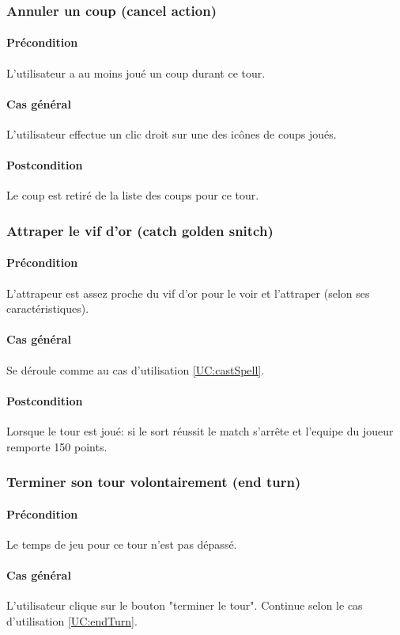 \subsubsection{Annuler un coup (cancel action)}
    \paragraph{Précondition} L'utilisateur a au moins joué un coup durant ce \gls{tour}.
    \paragraph{Cas général} L'utilisateur effectue un clic droit sur une des icônes de coups joués.
    \paragraph{Postcondition} Le coup est retiré de la liste des coups pour ce tour.

\subsubsection{Attraper le vif d'or (catch golden snitch)}
    \paragraph{Précondition} L'attrapeur est assez proche du vif d'or pour le voir et l'attraper (selon ses caractéristiques).
    \paragraph{Cas général} Se déroule comme au cas d'utilisation \ref{UC:castSpell}.
    \paragraph{Postcondition} Lorsque le tour est joué: si le sort réussit le match s'arrête et l'\gls{equipe} du joueur remporte 150 points.

\subsubsection{Terminer son tour volontairement (end turn)}
    \paragraph{Précondition} Le temps de jeu pour ce tour n'est pas dépassé.
    \paragraph{Cas général} L'utilisateur clique sur le bouton "terminer le tour". Continue selon le cas d'utilisation \ref{UC:endTurn}.

